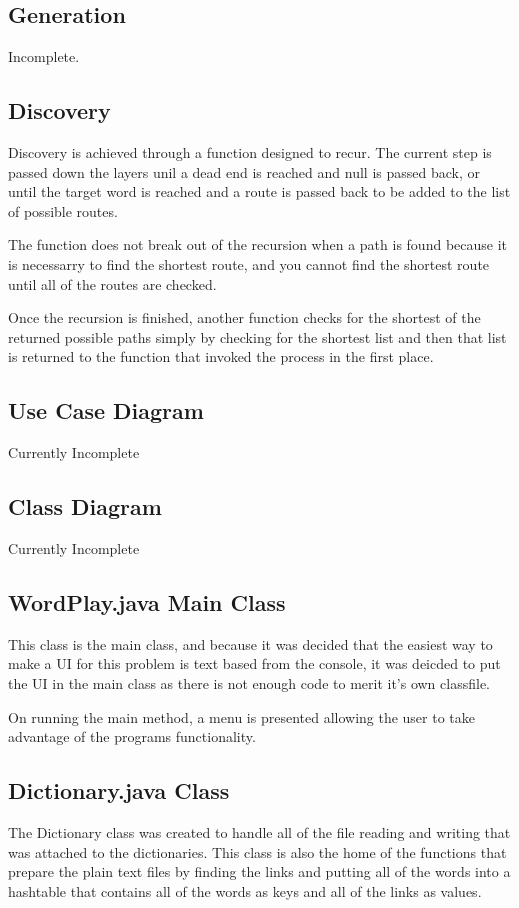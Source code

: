 \documentclass[final,a4paper,twoside,12pt]{report}
\begin{document}
\subsection{Generation}
Incomplete.
\subsection{Discovery}
Discovery is achieved through a function designed to recur. The 
current step is passed down the layers unil a dead end is reached 
and null is passed back, or until the target word is reached and
a route is passed back to be added to the list of possible routes.

The function does not break out of the recursion when a path is 
found because it is necessarry to find the shortest route, and
you cannot find the shortest route until all of the routes are
checked.

Once the recursion is finished, another function checks for the
shortest of the returned possible paths simply by checking for
the shortest list and then that list is returned to the function
that invoked the process in the first place.

\subsection{Use Case Diagram}
Currently Incomplete

\subsection{Class Diagram}
Currently Incomplete

\subsection{WordPlay.java Main Class}
This class is the main class, and because it was decided that the
easiest way to make a UI for this problem is text based from the 
console, it was deicded to put the UI in the main class as there
is not enough code to merit it's own classfile.

On running the main method, a menu is presented allowing the user
to take advantage of the programs functionality.

\subsection{Dictionary.java Class}
The Dictionary class was created to handle all of the file reading
and writing that was attached to the dictionaries. This class is
also the home of the functions that prepare the plain text files
by finding the links and putting all of the words into a hashtable
that contains all of the words as keys and all of the links as 
values.
\end{document}
